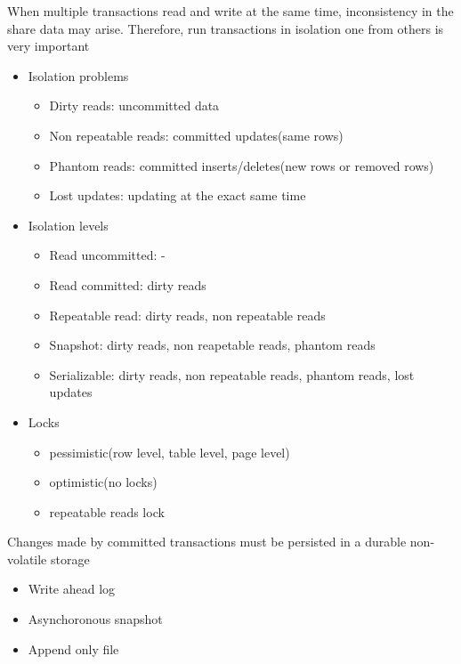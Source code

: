 \documentclass[../../main.tex]{subfiles}
\begin{document}
\begin{definition}[Isolation]
    When multiple transactions read and write at the same time, inconsistency in the share data may arise. Therefore, run transactions in isolation one from others is very important
    \begin{itemize}
        \item Isolation problems
        \begin{itemize}
            \item Dirty reads: uncommitted data
            \item Non repeatable reads: committed updates(same rows)
            \item Phantom reads: committed inserts/deletes(new rows or removed rows)
            \item Lost updates: updating at the exact same time
        \end{itemize}
        \item Isolation levels
        \begin{itemize}
            \item Read uncommitted: -
            \item Read committed: dirty reads
            \item Repeatable read: dirty reads, non repeatable reads
            \item Snapshot: dirty reads, non reapetable reads, phantom reads
            \item Serializable: dirty reads, non repeatable reads, phantom reads, lost updates
        \end{itemize}
        \item Locks
        \begin{itemize}
            \item pessimistic(row level, table level, page level)
            \item optimistic(no locks)
            \item repeatable reads lock
        \end{itemize}
    \end{itemize}
\end{definition}

\begin{definition}[Durability]
    Changes made by committed transactions must be persisted in a durable non-volatile storage
    \begin{itemize}
        \item Write ahead log
        \item Asynchoronous snapshot
        \item Append only file
    \end{itemize}
\end{definition}
\end{document}
